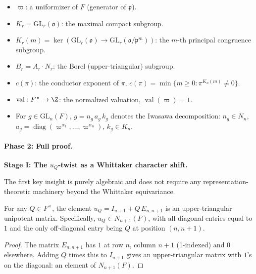 \begin{definition}[Notation]\label{def:p2-notation}
\begin{itemize}
\item $\varpi$: a uniformizer of $F$ (generator of $\mathfrak{p}$).
\item $K_r = \mathrm{GL}_r(\mathfrak{o})$: the maximal compact subgroup.
\item $K_r(m) = \ker(\mathrm{GL}_r(\mathfrak{o}) \to \mathrm{GL}_r(\mathfrak{o}/\mathfrak{p}^m))$:
  the $m$-th principal congruence subgroup.
\item $B_r = A_r \cdot N_r$: the Borel (upper-triangular) subgroup.
\item $c(\pi)$: the conductor exponent of $\pi$,
  $c(\pi) = \min\{m \geq 0 : \pi^{K_n(m)} \neq 0\}$.
\item $\operatorname{val} : F^\times \to \Z$: the normalized valuation,
  $\operatorname{val}(\varpi) = 1$.
\item For $g \in \mathrm{GL}_n(F)$, $g = n_g\,a_g\,k_g$ denotes the
  Iwasawa decomposition: $n_g \in N_n$,
  $a_g = \operatorname{diag}(\varpi^{\alpha_1}, \ldots, \varpi^{\alpha_n})$,
  $k_g \in K_n$.
\end{itemize}
\end{definition}

\paragraph{Phase 2: Full proof.}

\bigskip
\noindent\textbf{Stage I: The $u_Q$-twist as a Whittaker character shift.}

The first key insight is purely algebraic and does not require any
representation-theoretic machinery beyond the Whittaker equivariance.

\begin{lemma}\label{lem:uQ-in-N}
For any $Q \in F^\times$, the element $u_Q = I_{n+1} + Q\,E_{n,n+1}$ is an
upper-triangular unipotent matrix. Specifically, $u_Q \in N_{n+1}(F)$, with
all diagonal entries equal to $1$ and the only off-diagonal entry being
$Q$ at position $(n, n+1)$.
\end{lemma}

\begin{proof}
The matrix $E_{n,n+1}$ has $1$ at row $n$, column $n+1$ (1-indexed) and $0$
elsewhere. Adding $Q$ times this to $I_{n+1}$ gives an upper-triangular matrix
with $1$'s on the diagonal: an element of $N_{n+1}(F)$.
\end{proof}

